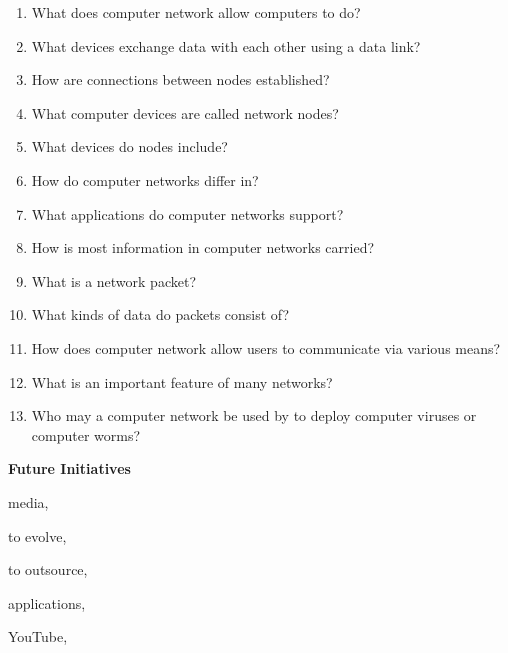\documentclass[a4paper]{article}
\begin{document}
\begin{enumerate}[label={\textbf{\Roman*.}},leftmargin=0pt,itemindent=*]
  \vspace{4ex}


    \begin{enumerate}[label=\arabic*.]
      \item What does computer network allow computers to do?
      \item What devices exchange data with each other using a data link?
      \item How are connections between nodes established?
      \item What computer devices are called network nodes?
      \item What devices do nodes include?
      \item How do computer networks differ in?
      \item What applications do computer networks support?
      \item How is most information in computer networks carried?
      \item What is a network packet?
      \item What kinds of data do packets consist of?

      \item How does computer network allow users to communicate via various
        means?

      \item What is an important feature of many networks?

      \item Who may a computer network be used by to deploy computer viruses or
        computer worms?

    \end{enumerate}



    \begin{center}
      \textbf{Future Initiatives}
    \end{center}

    {\itshape\noindent\begin{enumerate*}[label=\alph*)]
      \item media,
      \item to evolve,
      \item to outsource,
      \item applications,
      \item YouTube, \\


\end{enumerate*}}
\end{enumerate}
\end{document}
